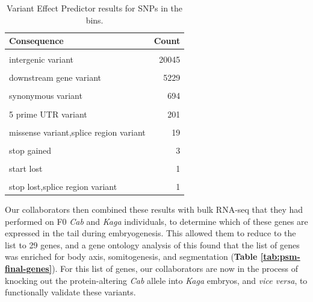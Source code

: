 \documentclass[
]{book}
\begin{document}
\begin{table}

\caption{\label{tab:int-consequence-tbl}Variant Effect Predictor results for SNPs in the bins.}
\centering
\begin{tabular}[t]{lr}
\toprule
Consequence & Count\\
\midrule
\cellcolor{gray!6}{intron variant} & \cellcolor{gray!6}{47211}\\
intergenic variant & 20045\\
\cellcolor{gray!6}{upstream gene variant} & \cellcolor{gray!6}{7304}\\
downstream gene variant & 5229\\
\cellcolor{gray!6}{3 prime UTR variant} & \cellcolor{gray!6}{1082}\\
\addlinespace
synonymous variant & 694\\
\cellcolor{gray!6}{missense variant} & \cellcolor{gray!6}{383}\\
5 prime UTR variant & 201\\
\cellcolor{gray!6}{splice region variant,intron variant} & \cellcolor{gray!6}{126}\\
missense variant,splice region variant & 19\\
\addlinespace
\cellcolor{gray!6}{splice region variant,synonymous variant} & \cellcolor{gray!6}{17}\\
stop gained & 3\\
\cellcolor{gray!6}{splice donor variant} & \cellcolor{gray!6}{1}\\
start lost & 1\\
\cellcolor{gray!6}{stop lost} & \cellcolor{gray!6}{1}\\
\addlinespace
stop lost,splice region variant & 1\\
\bottomrule
\end{tabular}
\end{table}

Our collaborators then combined these results with bulk RNA-seq that they had performed on F0 \emph{Cab} and \emph{Kaga} individuals, to determine which of these genes are expressed in the tail during embryogenesis. This allowed them to reduce to the list to 29 genes, and a gene ontology analysis of this found that the list of genes was enriched for body axis, somitogenesis, and segmentation (\textbf{Table \ref{tab:psm-final-genes}}). For this list of genes, our collaborators are now in the process of knocking out the protein-altering \emph{Cab} allele into \emph{Kaga} embryos, and \emph{vice versa}, to functionally validate these variants.
\end{document}
